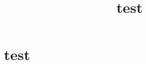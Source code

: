 \documentclass{article}
\title{test}
\author{}
\date{}
\begin{document}
\maketitle

\section{test}
\begin{tcolorbox}

\end{tcolorbox}
\end{document}
